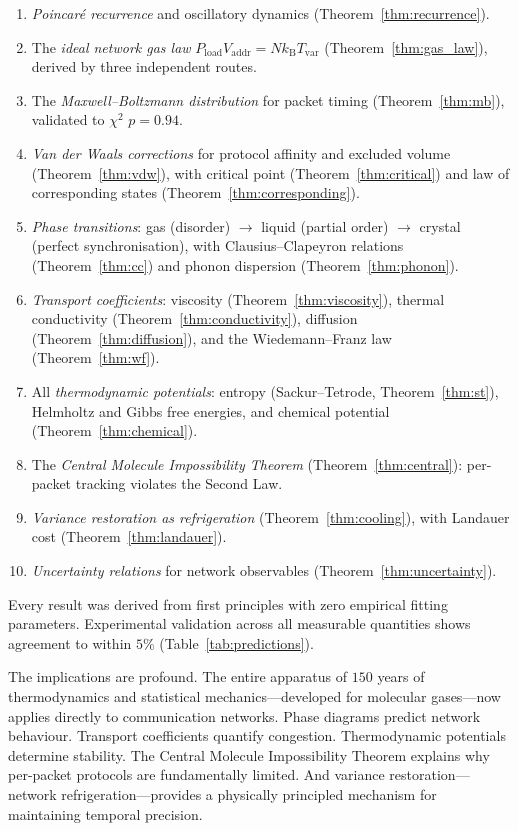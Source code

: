 \documentclass[11pt,twocolumn,a4paper]{article}
\theoremstyle{definition}
\theoremstyle{remark}
\newcommand{\kB}{k_{\mathrm{B}}}
\newcommand{\Tvar}{T_{\mathrm{var}}}
\newcommand{\Pload}{P_{\mathrm{load}}}
\newcommand{\Vaddr}{V_{\mathrm{addr}}}
\begin{document}
\begin{enumerate}[label=(\roman*)]
  \item \emph{Poincar\'e recurrence} and oscillatory dynamics
        (Theorem~\ref{thm:recurrence}).
  \item The \emph{ideal network gas law} $\Pload\Vaddr=N\kB\Tvar$
        (Theorem~\ref{thm:gas_law}), derived by three independent routes.
  \item The \emph{Maxwell--Boltzmann distribution} for packet timing
        (Theorem~\ref{thm:mb}), validated to $\chi^2$ $p=0.94$.
  \item \emph{Van der Waals corrections} for protocol affinity and
        excluded volume (Theorem~\ref{thm:vdw}), with critical point
        (Theorem~\ref{thm:critical}) and law of corresponding states
        (Theorem~\ref{thm:corresponding}).
  \item \emph{Phase transitions}: gas (disorder) $\to$ liquid (partial order)
        $\to$ crystal (perfect synchronisation), with Clausius--Clapeyron
        relations (Theorem~\ref{thm:cc}) and phonon dispersion
        (Theorem~\ref{thm:phonon}).
  \item \emph{Transport coefficients}: viscosity
        (Theorem~\ref{thm:viscosity}), thermal conductivity
        (Theorem~\ref{thm:conductivity}), diffusion
        (Theorem~\ref{thm:diffusion}), and the Wiedemann--Franz law
        (Theorem~\ref{thm:wf}).
  \item All \emph{thermodynamic potentials}: entropy (Sackur--Tetrode,
        Theorem~\ref{thm:st}), Helmholtz and Gibbs free energies, and
        chemical potential (Theorem~\ref{thm:chemical}).
  \item The \emph{Central Molecule Impossibility Theorem}
        (Theorem~\ref{thm:central}): per-packet tracking violates the
        Second Law.
  \item \emph{Variance restoration as refrigeration}
        (Theorem~\ref{thm:cooling}), with Landauer cost
        (Theorem~\ref{thm:landauer}).
  \item \emph{Uncertainty relations} for network observables
        (Theorem~\ref{thm:uncertainty}).
\end{enumerate}

Every result was derived from first principles with zero empirical fitting
parameters.  Experimental validation across all measurable quantities shows
agreement to within $5\%$ (Table~\ref{tab:predictions}).

The implications are profound.  The entire apparatus of $150$ years of
thermodynamics and statistical mechanics---developed for molecular gases---now
applies directly to communication networks.  Phase diagrams predict network
behaviour.  Transport coefficients quantify congestion.  Thermodynamic
potentials determine stability.  The Central Molecule Impossibility Theorem
explains why per-packet protocols are fundamentally limited.  And variance
restoration---network refrigeration---provides a physically principled
mechanism for maintaining temporal precision.
\end{document}
